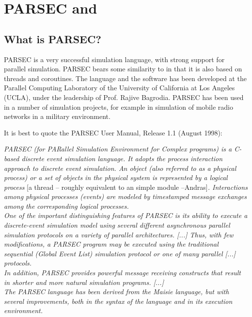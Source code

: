 \chapter{PARSEC and {\opp}}
\label{cha:parsec-and-omnet}


\section{What is PARSEC?}

PARSEC is a very successful simulation language, with
strong support for parallel simulation. PARSEC bears some similarity
to {\opp} in that it is also based on threads and coroutines. The
language and the software has been developed at the Parallel Computing
Laboratory of the University of California at Los Angeles (UCLA),
under the leadership of Prof. Rajive Bagrodia. PARSEC has been used in
a number of simulation projects, for example in simulation of mobile
radio networks in a military environment.


It is best to quote the PARSEC User Manual, Release 1.1 (August 
1998):


\textit{PARSEC (for PARallel Simulation Environment for Complex
  programs) is a C-based discrete event simulation language. It adopts
  the process interaction approach to discrete event simulation. An
  object (also referred to as a physical process) or a set of objects
  in the physical system is represented by a logical process} [a
thread -- roughly equivalent to an {\opp} simple module
--Andras]\textit{. Interactions among physical processes (events) are
  modeled by timestamped message exchanges among the corresponding
  logical  processes.\\  
  One of the important distinguishing features of PARSEC is its
  ability to execute a discrete-event simulation model using several
  different asynchronous parallel simulation protocols on a variety of
  parallel architectures. [...] Thus, with few modifications, a PARSEC
  program may be executed using the traditional sequential (Global
  Event List) simulation protocol or one of many parallel
  [...] protocols.\\  
  In addition, PARSEC provides powerful message receiving constructs
  that result in shorter and more natural simulation programs.
  [...]\\  
  The PARSEC language has been derived from the Maisie language, but
  with several improvements, both in the syntax of the language
  and in its execution environment.}

